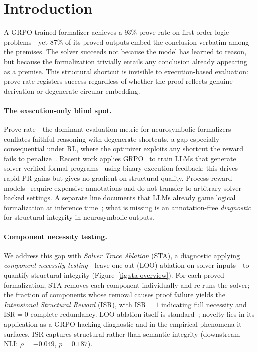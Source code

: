 \section{Introduction}
\label{sec:introduction}

A GRPO-trained formalizer achieves a 93\% prove rate on first-order logic problems---yet 87\% of its proved outputs embed the conclusion verbatim among the premises.
The solver succeeds not because the model has learned to reason, but because the formalization trivially entails any conclusion already appearing as a premise.
This structural shortcut is invisible to execution-based evaluation: prove rate registers success regardless of whether the proof reflects genuine derivation or degenerate circular embedding.

\paragraph{The execution-only blind spot.}
Prove rate---the dominant evaluation metric for neurosymbolic formalizers~\citep{logic-lm, linc, satlm}---conflates faithful reasoning with degenerate shortcuts, a gap especially consequential under RL, where the optimizer exploits any shortcut the reward fails to penalize~\citep{skalse-reward-hacking, reward-hacking-survey}.
Recent work applies GRPO~\citep{deepseekmath} to train LLMs that generate solver-verified formal programs~\citep{mellgren-prolog-grpo, logic-rl} using binary execution feedback; this drives rapid PR gains but gives no gradient on structural quality.
Process reward models~\citep{lightman-verify-step, math-shepherd} require expensive annotations and do not transfer to arbitrary solver-backed settings.
A separate line documents that LLMs already game logical formalization at inference time~\citep{kim-game-formalization, bondarenko-spec-gaming}; what is missing is an annotation-free \emph{diagnostic} for structural integrity in neurosymbolic outputs.

\paragraph{Component necessity testing.}
We address this gap with \emph{Solver Trace Ablation} (STA), a diagnostic applying \emph{component necessity testing}---leave-one-out (LOO) ablation on solver inputs---to quantify structural integrity (Figure~\ref{fig:sta-overview}).
For each proved formalization, STA removes each component individually and re-runs the solver; the fraction of components whose removal causes proof failure yields the \emph{Intensional Structural Reward} (ISR), with $\text{ISR}{=}1$ indicating full necessity and $\text{ISR}{=}0$ complete redundancy.
LOO ablation itself is standard~\citep{demillo1978, jia-harman-survey}; novelty lies in its application as a GRPO-hacking diagnostic and in the empirical phenomena it surfaces.
ISR captures structural rather than semantic integrity (downstream NLI: $\rho{=}{-}0.049$, $p{=}0.187$).


